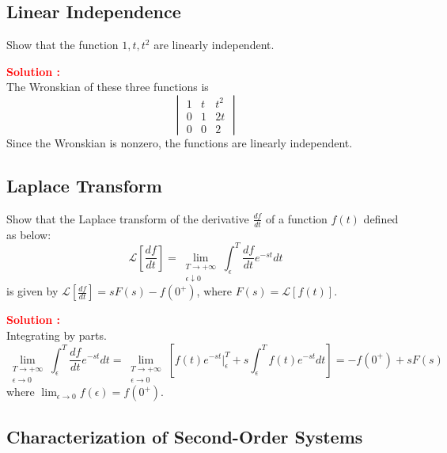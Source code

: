 \documentclass[12pt]{article}
\begin{document}
\clearpage
\subsection{Linear Independence}

Show that the function \(1,t,t^2\) are linearly independent.


\textbf{\textcolor{red}{Solution :}} \\

The Wronskian of these three functions is 
\begin{equation}
    \begin{vmatrix}
1 & t  & t^2 \\

0 & 1  & 2t \\
0 & 0 & 2

\end{vmatrix}
\end{equation}
Since the Wronskian is nonzero, the functions are linearly independent.


\clearpage
\subsection{Laplace Transform}

Show that the Laplace transform of the derivative \(\frac{df}{dt}\) of a function \(f(t)\) defined as below:
\begin{equation}
    \mathcal{L}\left[ \frac{df}{dt} \right] = \lim_{\substack{T \to +\infty \\ \epsilon \downarrow 0}} \int_{\epsilon}^T \frac{df}{dt} e^{-st} dt
\end{equation}
is given by \(\mathcal{L}\left[ \frac{df}{dt} \right] = sF(s)-f(0^+)\), where \(F(s) = \mathcal{L}[f(t)]\).

\textbf{\textcolor{red}{Solution :}} \\

Integrating by parts.
\begin{equation}
    \lim_{\substack{T \to +\infty \\ \epsilon \to 0}} \int_{\epsilon}^T \frac{df}{dt} e^{-st} dt = \lim_{\substack{T \to +\infty \\ \epsilon \to 0}} \left[ f(t) e^{-st}|_{\epsilon}^T + s \int_{\epsilon}^T f(t) e^{-st} dt\right] = -f(0^+)+s F(s)
\end{equation}
where \(\lim_{\epsilon \rightarrow 0}f(\epsilon) = f(0^+)\).

\clearpage
\subsection{Characterization of Second-Order Systems}
\end{document}
